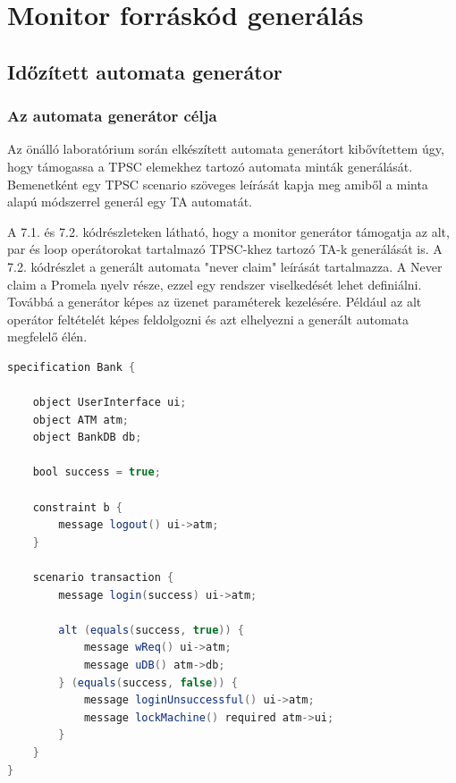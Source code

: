 \chapter{Monitor forráskód generálás}\section{Időzített automata generátor}

\subsection{Az automata generátor célja}

Az önálló laboratórium során elkészített automata generátort kibővítettem úgy, hogy támogassa a TPSC elemekhez tartozó automata minták generálását. Bemenetként egy TPSC scenario szöveges leírását kapja meg amiből a minta alapú módszerrel generál egy TA automatát.

A 7.1. és 7.2. kódrészleteken látható, hogy a monitor generátor támogatja az alt, par és loop operátorokat tartalmazó TPSC-khez tartozó TA-k generálását is.
A 7.2. kódrészlet a generált automata "never claim" leírását tartalmazza.
A Never claim a Promela nyelv része, ezzel egy rendszer viselkedését lehet definiálni.
Továbbá a generátor képes az üzenet paraméterek kezelésére.
Például az alt operátor feltételét képes feldolgozni és azt elhelyezni a generált automata megfelelő élén.

\begin{lstlisting}[language=java,frame=single, float=h!, caption={Alt operátort tartalmazó scenario.},captionpos=b]
specification Bank {

	object UserInterface ui;
	object ATM atm;
	object BankDB db;

	bool success = true;

	constraint b {
		message logout() ui->atm;
	}

	scenario transaction {
		message login(success) ui->atm;

		alt (equals(success, true)) {
			message wReq() ui->atm;
			message uDB() atm->db;
		} (equals(success, false)) {
			message loginUnsuccessful() ui->atm;
			message lockMachine() required atm->ui;
		}
	}
}
\end{lstlisting}

